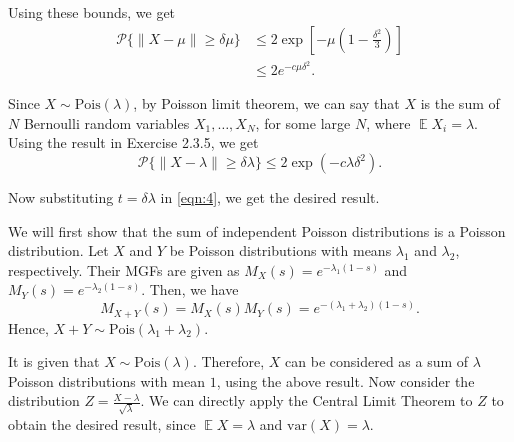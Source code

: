 \documentclass[11pt]{article}
\newenvironment{exercise}[2][Exercise]{\begin{trivlist}
\item[\hskip \labelsep {\bfseries #1}\hskip \labelsep {\bfseries #2.}]}{\end{trivlist}}
\newenvironment{solution}[1][Solution]{\begin{trivlist}
\item[\hskip \labelsep {\bfseries #1}\hskip \labelsep]}{\end{trivlist}}
\DeclareMathOperator*{\E}{\mathbb{E}}
\begin{document}
\begin{solution}
Using these bounds, we get
\begin{align*}
\mathcal{P}\{ \lVert X-\mu \rVert \geq \delta\mu \} &\leq 2\exp\left[-\mu\left(1 - \frac{\delta^2}{3} \right)\right] \\
	&\leq 2e^{-c\mu \delta^2}.
\end{align*}

\end{solution}

\begin{exercise}{2.3.6}
\end{exercise}

\begin{solution}
Since $X \sim \text{Pois}(\lambda)$, by Poisson limit theorem, we can say that $X$ is the sum of $N$ Bernoulli random variables $X_1, \ldots, X_N$, for some large $N$, where $\E X_i = \lambda$. Using the result in Exercise 2.3.5, we get
\begin{equation}
\mathcal{P}\{ \lVert X - \lambda \rVert \geq \delta\lambda \} \leq 2\exp(-c\lambda\delta^2).
\label{eqn:4}
\end{equation}

Now substituting $t=\delta \lambda$ in \ref{eqn:4}, we get the desired result.
\end{solution}

\begin{exercise}{2.3.8}
\end{exercise}

\begin{solution}
We will first show that the sum of independent Poisson distributions is a Poisson distribution. Let $X$ and $Y$ be Poisson distributions with means $\lambda_1$ and $\lambda_2$, respectively. Their MGFs are given as $M_X(s) = e^{-\lambda_1(1-s)}$ and $M_Y(s) = e^{-\lambda_2(1-s)}$. Then, we have
\begin{equation*}
M_{X+Y}(s) = M_X(s)M_Y(s) = e^{-(\lambda_1 + \lambda_2)(1-s)}.
\end{equation*}
Hence, $X+Y \sim \text{Pois}(\lambda_1 + \lambda_2)$. 

It is given that $X \sim \text{Pois}(\lambda)$. Therefore, $X$ can be considered as a sum of $\lambda$ Poisson distributions with mean $1$, using the above result. Now consider the distribution $Z = \frac{X - \lambda}{\sqrt{\lambda}}$. We can directly apply the Central Limit Theorem to $Z$ to obtain the desired result, since $\E X = \lambda$ and $\text{var}(X) = \lambda$.  
\end{solution}
\end{document}

